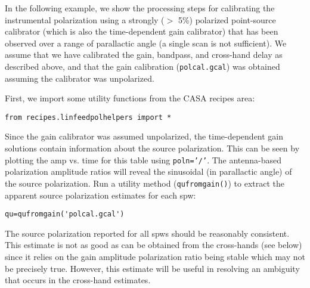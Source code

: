 In the following example, we show the processing steps for calibrating
the instrumental polarization using a strongly ($>$ 5\%) polarized
point-source calibrator (which is also the time-dependent gain
calibrator) that has been observed over a range of parallactic angle
(a single scan is not sufficient).  We assume that we have calibrated
the gain, bandpass, and cross-hand delay as described above, and that
the gain calibration ({\tt polcal.gcal}) was obtained assuming the
calibrator was unpolarized.

First, we import some utility functions from the CASA recipes
area:

\small
\begin{verbatim}
from recipes.linfeedpolhelpers import *
\end{verbatim}

\normalsize 

Since the gain calibrator was assumed unpolarized, the time-dependent
gain solutions contain information about the source polarization.
This can be seen by plotting the amp vs. time for this table using
{\tt poln='/'}.  The antenna-based polarization amplitude ratios will
reveal the sinusoidal (in parallactic angle) of the source
polarization.  Run a utility method ({\tt qufromgain()}) to extract
the apparent source polarization estimates for each spw:

\small
\begin{verbatim}
qu=qufromgain('polcal.gcal')
\end{verbatim}

\normalsize

The source polarization reported for all spws should be reasonably
consistent.  This estimate is not as good as can be obtained from
the cross-hands (see below) since it relies on the gain amplitude 
polarization ratio being stable which may not be precisely true.
However, this estimate will be useful in resolving an ambiguity
that occurs in the cross-hand estimates.


